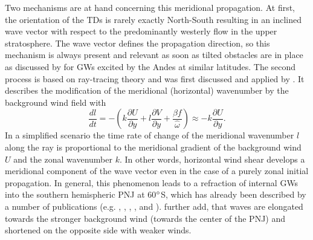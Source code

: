 Two mechanisms are at hand concerning this meridional propagation. At first, the orientation of the TDs is rarely exactly North-South resulting in an inclined wave vector with respect to the predominantly westerly flow in the upper stratosphere. The wave vector defines the propagation direction, so this mechanism is always present and relevant as soon as tilted obstacles are in place as discussed by \textcite{preusse_space-based_2002} for GWs excited by the Andes at similar latitudes. The second process is based on ray-tracing theory and was first discussed and applied by \textcite{dunkerton_dunkerton_inertiagravity_1984}. It describes the modification of the meridional (horizontal) wavenumber by the background wind field with
%
\begin{equation}
    \frac{dl}{dt} = -(k \frac{\partial U}{\partial y} + l \frac{\partial V}{\partial y} + \frac{\beta f}{\hat{\omega}})
    \approx -k \frac{\partial U}{\partial y}.
    \label{equ:meridionalRefraction}
\end{equation}
%
In a simplified scenario the time rate of change of the meridional wavenumber $l$ along the ray is proportional to the meridional gradient of the background wind $U$ and the zonal wavenumber $k$. In other words, horizontal wind shear develops a meridional component of the wave vector even in the case of a purely zonal initial propagation. In general, this phenomenon leads to a refraction of internal GWs into the southern hemispheric PNJ at 60$\degree$S, which has already been described by a number of publications (e.g. \cite{dunkerton_dunkerton_inertiagravity_1984}, \cite{preusse_space-based_2002}, \cite{sato_origins_2009}, \cite{sato_gravity_2012}, \cite{ehard_horizontal_2017} and \cite{jiang_stratospheric_2019}). \textcite{jiang_stratospheric_2019} further add, that waves are elongated towards the stronger background wind (towards the center of the PNJ) and shortened on the opposite side with weaker winds.

